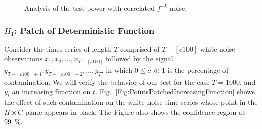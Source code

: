 \documentclass[alpha-refs]{wiley-article}
\begin{document}
\begin{figure}
	\centering
	\caption{Analysis of the test power with correlated $f^{-k}$ noise.}
	\label{fig:correlation}
\end{figure}

\subsubsection{$H_1$: Patch of Deterministic Function}

Consider the times series of length $T$ comprised of $T-[c100]$ white noise observations $x_1,x_2,\dots, x_{T-[c100]}$ followed by the signal $y_{T-[c100]+1}, y_{T-[c100]+2}, \dots, y_T$, in which $0\leq c \ll 1$ is the percentage of contamination.
We will verify the behavior of our test for the case $T=1000$, and $y_t$ an increasing function on $t$.
Fig.~\ref{Fig:PointsPatchedIncreasingFunction} shows the effect of such contamination on the white noise time series whose point in the $H\times C$ plane appears in black.
The Figure also shows the confidence region at \SI{99}{\percent}.
\end{document}
